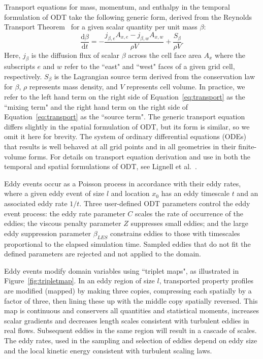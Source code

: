 \documentclass[preprint,12pt, a4paper]{elsarticle}
\begin{document}
Transport equations for mass, momentum, and enthalpy in the temporal formulation of ODT take the following generic form, derived from the Reynolds Transport Theorem~\cite{Cengel_2010} for a given scalar quantity per unit mass $\beta$: 
\begin{equation} 
\label{eq:transport}
	\frac{\mathrm{d}\beta}{\mathrm{d}t} = -\frac{j_{\beta,e}A_{x,e}-j_{\beta,w}A_{x,w}}{\rho V} + \frac{S_{\beta}}{\rho V}.
\end{equation}
Here, $j_{\beta}$ is the diffusion flux of scalar $\beta$ across the cell face area $A_x$ where the subscripts $e$ and $w$ refer to the ``east" and ``west" faces of a given grid cell, respectively. $S_{\beta}$ is the Lagrangian source term derived from the conservation law for $\beta$, $\rho$ represents mass density, and $V$ represents cell volume. In practice, we refer to the left hand term on the right side of Equation~\ref{eq:transport} as the ``mixing term" and the right hand term on the right side of Equation~\ref{eq:transport} as the ``source term". The generic transport equation differs slightly in the spatial formulation of ODT, but its form is similar, so we omit it here for brevity. The system of ordinary differential equations (ODEs) that results is well behaved at all grid points and in all geometries in their finite-volume forms. For details on transport equation derivation and use in both the temporal and spatial formulations of ODT, see Lignell et al.~\cite{Lignell_2018}. 

Eddy events occur as a Poisson process in accordance with their eddy rates, where a given eddy event of size $l$ and location $x_0$ has an eddy timescale $t$ and an associated eddy rate $1/t$. Three user-defined ODT parameters control the eddy event process: the eddy rate parameter $C$ scales the rate of occurrence of the eddies; the viscous penalty parameter $Z$ suppresses small eddies; and the large eddy suppression parameter $\beta_{LES}$ constrains eddies to those with timescales proportional to the elapsed simulation time. Sampled eddies that do not fit the defined parameters are rejected and not applied to the domain.

Eddy events modify domain variables using ``triplet maps", as illustrated in Figure~\ref{fig:tripletmap}. In an eddy region of size $l$, transported property profiles are modified (mapped) by making three copies, compressing each spatially by a factor of three, then lining these up with the middle copy spatially reversed.
This map is continuous and conservers all quantities and statistical moments, increases scalar gradients and decreases length scales consistent with turbulent eddies in real flows. Subsequent eddies in the same region will result in a cascade of scales. The eddy rates, used in the sampling and selection of eddies depend on eddy size and the local kinetic energy consistent with turbulent scaling laws.  
\end{document}
